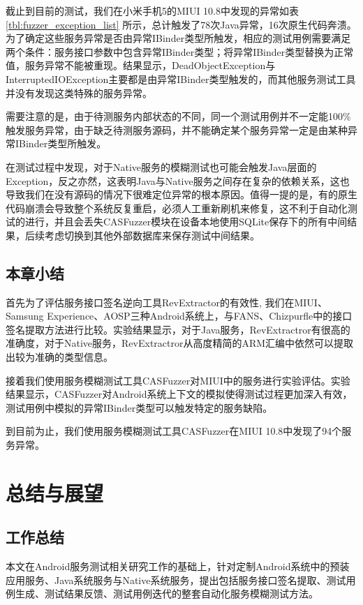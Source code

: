 \documentclass[winfonts,master,twoside]{njuthesis}
\begin{document}
截止到目前的测试，我们在小米手机5的MIUI 10.8中发现的异常如表\ref{tbl:fuzzer_exception_list} 所示，总计触发了78次Java异常，16次原生代码奔溃。为了确定这些服务异常是否由异常IBinder类型所触发，相应的测试用例需要满足两个条件：服务接口参数中包含异常IBinder类型；将异常IBinder类型替换为正常值，服务异常不能被重现。结果显示，DeadObjectException与InterruptedIOException主要都是由异常IBinder类型触发的，而其他服务测试工具并没有发现这类特殊的服务异常。

需要注意的是，由于待测服务内部状态的不同，同一个测试用例并不一定能100\%触发服务异常，由于缺乏待测服务源码，并不能确定某个服务异常一定是由某种异常IBinder类型所触发。

在测试过程中发现，对于Native服务的模糊测试也可能会触发Java层面的Exception，反之亦然，这表明Java与Native服务之间存在复杂的依赖关系，这也导致我们在没有源码的情况下很难定位异常的根本原因。值得一提的是，有的原生代码崩溃会导致整个系统反复重启，必须人工重新刷机来修复，这不利于自动化测试的进行，并且会丢失CASFuzzer模块在设备本地使用SQLite保存下的所有中间结果，后续考虑切换到其他外部数据库来保存测试中间结果。


\section{本章小结}

首先为了评估服务接口签名逆向工具RevExtractor的有效性, 我们在MIUI、Samsung Experience、AOSP三种Android系统上，与FANS、Chizpurfle中的接口签名提取方法进行比较。实验结果显示，对于Java服务，RevExtractror有很高的准确度，对于Native服务，RevExtractror从高度精简的ARM汇编中依然可以提取出较为准确的类型信息。

接着我们使用服务模糊测试工具CASFuzzer对MIUI中的服务进行实验评估。实验结果显示，CASFuzzer对Android系统上下文的模拟使得测试过程更加深入有效，测试用例中模拟的异常IBinder类型可以触发特定的服务缺陷。

到目前为止，我们使用服务模糊测试工具CASFuzzer在MIUI 10.8中发现了94个服务异常。

\chapter{总结与展望}
\section{工作总结}

本文在Android服务测试相关研究工作的基础上，针对定制Android系统中的预装应用服务、Java系统服务与Native系统服务，提出包括服务接口签名提取、测试用例生成、测试结果反馈、测试用例迭代的整套自动化服务模糊测试方法。
\end{document}
